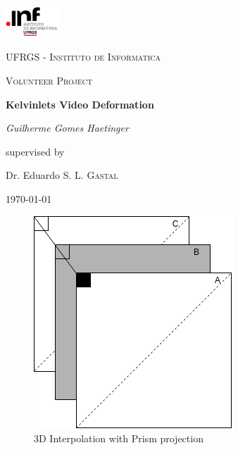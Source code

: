 \documentclass[14pt]{book}
\begin{document}
\begin{titlepage}
	\centering
	\includegraphics[width=0.15\textwidth]{res/inf.png}\par\vspace{1cm}
	{\scshape\LARGE UFRGS - Instituto de Informatica \par}
	\vspace{1cm}
	{\scshape\Large Volunteer Project\par}
	\vspace{1.5cm}
	{\huge\bfseries Kelvinlets Video Deformation\par}
	\vspace{2cm}
	{\Large\itshape Guilherme Gomes Haetinger\par}
	\vfill
	supervised by\par
	Dr. Eduardo S. L. \textsc{Gastal}

	\vfill

	{\large \today\par}
\end{titlepage}

\begin{figure}
	\includegraphics[width=\linewidth]{./res/interpolationExample.png}
	\caption{3D Interpolation with Prism projection}
	\label{fig:newInterp}
\end{figure}
\end{document}
